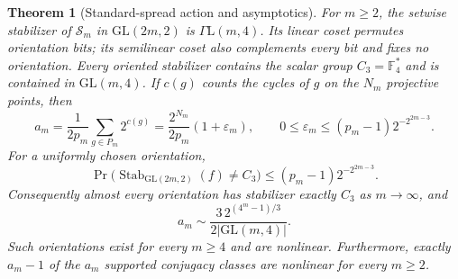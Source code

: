 \documentclass[11pt]{article}
\newtheorem{theorem}{Theorem}[section]
\begin{document}
\begin{theorem}[Standard-spread action and asymptotics]\label{thm:standard-asymptotic}
For $m\ge2$, the setwise stabilizer of $\mathcal S_m$ in
$\mathrm{GL}(2m,2)$ is $\Gamma\mathrm L(m,4)$.
Its linear coset permutes orientation bits; its semilinear coset also
complements every bit and fixes no orientation. Every oriented stabilizer
contains the scalar group $C_3=\mathbb F_4^*$ and is contained in
$\mathrm{GL}(m,4)$. If $c(g)$ counts the cycles of $g$ on the $N_m$
projective points, then
\begin{equation}\label{eq:standard-class}
a_m=\frac{1}{2p_m}\sum_{g\in P_m}2^{c(g)}
    =\frac{2^{N_m}}{2p_m}(1+\varepsilon_m),
\qquad
0\le\varepsilon_m\le(p_m-1)2^{-2^{2m-3}}.
\end{equation}
For a uniformly chosen orientation,
\begin{equation}\label{eq:standard-exception}
\Pr\bigl(\operatorname{Stab}_{\mathrm{GL}(2m,2)}(f)\ne C_3\bigr)
\le(p_m-1)2^{-2^{2m-3}}.
\end{equation}
Consequently almost every orientation has stabilizer exactly $C_3$ as
$m\to\infty$, and
\[
a_m\sim\frac{3\,2^{(4^m-1)/3}}{2|\mathrm{GL}(m,4)|}.
\]
Such orientations exist for every $m\ge4$ and are nonlinear.
Furthermore, exactly $a_m-1$ of the $a_m$ supported conjugacy classes
are nonlinear for every $m\ge2$.
\end{theorem}
\end{document}
